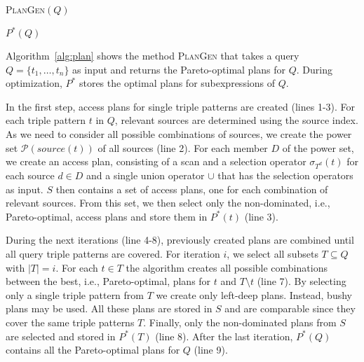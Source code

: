 \vspace{-0.2cm}
\begin{algorithm}
  \label{alg:plan}
  \DontPrintSemicolon

  \caption{\textsc{PlanGen}$(Q)$}


  \Return $P^*(Q)$
\end{algorithm}
\vspace{-0.2cm}
Algorithm~\ref{alg:plan} shows the method \textsc{PlanGen} that takes
a query $Q=\{t_1,\ldots,t_n\}$ as input and
returns the Pareto-optimal plans for $Q$. During optimization, $P^*$
stores the optimal plans for subexpressions of $Q$.

In the first step, access plans for single triple patterns are created
(lines 1-3). For each triple pattern $t$ in $Q$, relevant
sources are determined using the source index. As we need to
consider all possible combinations of sources, we create the power set
$\mathcal{P}(source(t))$ of all sources (line 2). For each member $D$ of
the power set, we create an access plan, consisting of a scan and a selection operator $\sigma_{T^d}(t)$ for each source $d \in D$ and a
single union operator $\cup$ that has the selection operators as
input. $S$ then contains a set of access plans, one for each
combination of relevant sources. From this set, we then select only
the non-dominated, i.e., Pareto-optimal, access plans and store them
in $P^*(t)$ (line 3).

During the next iterations (line 4-8), previously
created plans are combined until all query triple patterns are
covered. For iteration $i$, we select all subsets $T \subseteq Q$ with
$|T|=i$. For each $t \in T$ the algorithm creates all possible combinations
between the best, i.e., Pareto-optimal, plans for $t$ and $T\setminus
t$ (line 7). By selecting only a single triple pattern from $T$ we
create only left-deep plans. Instead, bushy plans may be used.
All these plans are stored in $S$ and are comparable since they cover
the same triple patterns $T$. Finally, only the non-dominated plans
from $S$ are selected and stored in $P^*(T)$ (line 8). After the last
iteration, $P^*(Q)$ contains all the Pareto-optimal plans for
$Q$ (line 9).

